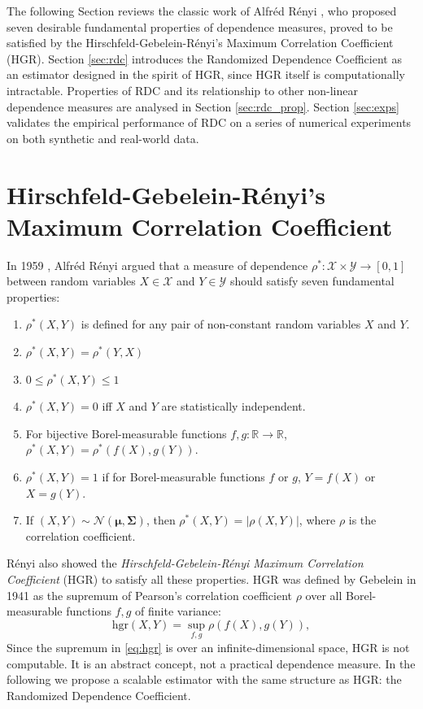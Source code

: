 \documentclass{article}
\begin{document}
The following Section reviews the classic work of Alfr\'ed R\'enyi
\cite{Renyi59}, who proposed seven desirable fundamental properties of
dependence measures, proved to be satisfied by the
Hirschfeld-Gebelein-R\'enyi's Maximum Correlation Coefficient (HGR). Section
\ref{sec:rdc} introduces the Randomized Dependence Coefficient as an estimator
designed in the spirit of HGR, since HGR itself is computationally intractable.
Properties of RDC and its relationship to other non-linear dependence measures
are analysed in Section \ref{sec:rdc_prop}. Section \ref{sec:exps} validates
the empirical performance of RDC on a series of numerical experiments on both
synthetic and real-world data.

\section{Hirschfeld-Gebelein-R\'enyi's Maximum Correlation
Coefficient}\label{sec:renyi}
In 1959 \cite{Renyi59}, Alfr\'ed R\'enyi argued that a measure of dependence
$\rho^* : \mathcal{X} \times \mathcal{Y} \rightarrow [0,1]$ between random
variables $X\in\mathcal{X}$ and $Y\in\mathcal{Y}$ should satisfy seven
fundamental properties:
\begin{enumerate}
  \item $\rho^*(X,Y)$ is defined for any pair of non-constant random variables
  $X$ and $Y$.
  \item $\rho^*(X,Y) = \rho^*(Y,X)$
  \item $0 \leq \rho^*(X,Y) \leq 1$
  \item $\rho^*(X,Y) = 0$ iff $X$ and $Y$ are statistically independent.
  \item For bijective  Borel-measurable functions $f,g : \mathbb{R}
  \rightarrow \mathbb{R}$, $\rho^*(X,Y) = \rho^*(f(X),g(Y))$.
  \item $\rho^*(X,Y) = 1$ if for Borel-measurable functions $f$ or $g$, $Y =
  f(X)$ or $X = g(Y)$.
  \item If $(X,Y) \sim \mathcal{N}(\bm \mu, \bm \Sigma)$, then $\rho^*(X,Y) =
  |\rho(X,Y)|$, where $\rho$ is the correlation coefficient.
\end{enumerate}
R\'enyi also showed the \emph{Hirschfeld-Gebelein-R\'enyi Maximum
  Correlation Coefficient} (HGR) \cite{Gebelein41,Renyi59} to satisfy
all these properties. HGR was defined by Gebelein in 1941
\cite{Gebelein41} as the supremum of Pearson's correlation coefficient
$\rho$ over all Borel-measurable functions $f,g$ of finite variance:
\begin{equation}\label{eq:hgr}
  \text{hgr}(X,Y) = \sup_{f,g} \rho(f(X),g(Y)),
\end{equation}
Since the supremum in \eqref{eq:hgr} is over an infinite-dimensional
space, HGR is not computable. It is an abstract concept, not a
practical dependence measure. In the following we propose a scalable
estimator with the same structure as HGR: the Randomized Dependence
Coefficient.
\end{document}
